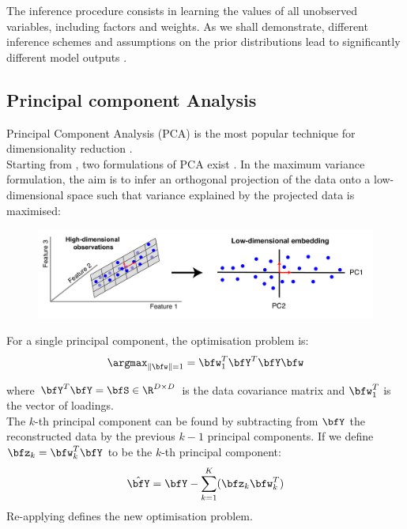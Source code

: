 The inference procedure consists in learning the values of all unobserved variables, including factors and weights. As we shall demonstrate, different inference schemes and assumptions on the prior distributions lead to significantly different model outputs \cite{Rattray2009}.

\subsection{Principal component Analysis} \label{section:pca}
Principal Component Analysis (PCA) is the most popular technique for dimensionality reduction \cite{Hotelling1933,Ringner2008}.\\
Starting from , two formulations of PCA exist \cite{Bishop}. In the maximum variance formulation, the aim is to infer an orthogonal projection of the data onto a low-dimensional space such that variance explained by the projected data is maximised:

\begin{figure}[H]
	\centering
	\includegraphics[width=1.0\linewidth]{pca1}
	\caption[]{}
	\label{fig:pca1}
\end{figure}

For a single principal component, the optimisation problem is:
\begin{equation} \label{eq:pca}
	\argmax_{\|\bfw\|=1} = \bfw_1^T \bfY^T \bfY \bfw
\end{equation}

where $\bfY^T \bfY=\bfS \in \R^{D \times D}$ is the data covariance matrix and $\bfw_1^T$ is the vector of loadings. \\
The $k$-th principal component can be found by subtracting from $\bfY$ the reconstructed data by the previous $k-1$ principal components. If we define $\bfz_k=\bfw_k^T \bfY$ to be the $k$-th principal component:
\[
	\hat{\bfY} = \bfY - \sum_{k=1}^{K} (\bfz_k \bfw_k^T)
\]
Re-applying  defines the new optimisation problem.\\

